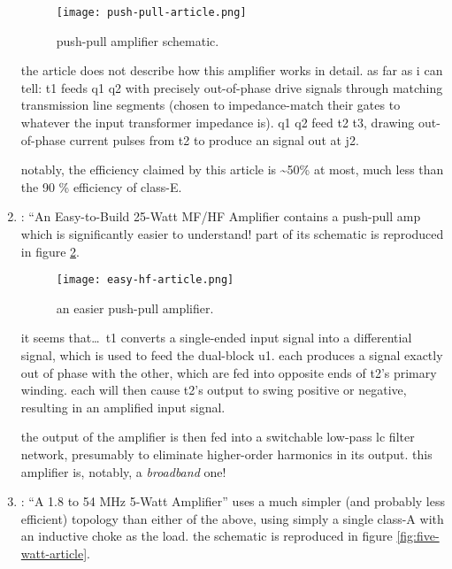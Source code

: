 \begin{enumerate}
	\begin{figure}[H]
		\centering
		\texttt{[image: push-pull-article.png]}
		\caption{push-pull amplifier schematic.}
		\label{fig:push-pull-article}
	\end{figure}

	the article does not describe how this amplifier works in detail. as
	far as i can tell: \pr t1 feeds \pr q1 \amp \pr q2 with precisely
	out-of-phase drive signals through matching transmission line segments
	 (chosen to impedance-match their gates to whatever
	the input transformer impedance is). \pr q1 \amp \pr q2 feed \pr t2
	\amp \pr t3, drawing out-of-phase current pulses from \pr t2 to produce
	an \rf signal out at \pr j2.

	notably, the efficiency claimed by this article is \textasciitilde 50\%
	at most, much less than the 90 \% efficiency of class-E.

	\item \autocite[p.~1 dash 2]{rf-amp-classics}: ``An Easy-to-Build
	25-Watt MF/HF Amplifier contains a push-pull amp which is significantly
	easier to understand! part of its schematic is reproduced in figure
	\ref{fig:easy-hf-article}.

	\begin{figure}[H]
		\centering
		\texttt{[image: easy-hf-article.png]}
		\caption{an easier push-pull amplifier.}
		\label{fig:easy-hf-article}
	\end{figure}

	it seems that\ldots\ \pr t1 converts a single-ended input signal into a
	differential signal, which is used to feed the dual-\jfet block \pr u1.
	each \jfet produces a signal exactly out of phase with the other, which
	are fed into opposite ends of \pr t2's primary winding. each \jfet will
	then cause \pr t2's output to swing positive or negative, resulting in
	an amplified input signal.

	the output of the amplifier is then fed into a switchable low-pass lc
	filter network, presumably to eliminate higher-order harmonics in its
	output. this amplifier is, notably, a \emph{broadband} one!

	\item \autocite[p.~1 dash 19]{rf-amp-classics}: ``A 1.8 to 54 MHz
	5-Watt Amplifier'' uses a much simpler (and probably less efficient)
	topology than either of the above, using simply a single \mosfet
	class-A with an inductive choke as the load. the schematic is
	reproduced in figure \ref{fig:five-watt-article}.


\end{enumerate}

